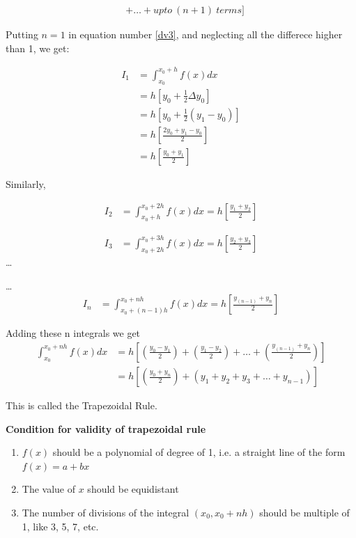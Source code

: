 \documentclass[11pt, a4paper, oneside]{book}
\begin{document}
          \begin{align}\label{dv3}
              &+ \dots+upto\ (n+1)\ terms]
          \end{align}

          Putting $n=1$ in equation number \ref{dv3}, and neglecting all the differece
          higher than 1, we get:

          \begin{align*}
            I_1 &= \int_{x_0}^{x_0+h}f(x)dx\\
                &= h[y_0+\frac{1}{2}\Delta y_0]\\
                &= h[y_0+\frac{1}{2}(y_1-y_0)]\\
                &= h[\frac{2y_0+y_1-y_0}{2}]\\
                &= h[\frac{y_0+y_1}{2}]
          \end{align*}

          Similarly,

          \begin{align*}
            I_2 &= \int_{x_0+h}^{x_0+2h}f(x)dx = h[\frac{y_1+y_2}{2}]
          \end{align*}

          \begin{align*}
            I_3 &= \int_{x_0+2h}^{x_0+3h}f(x)dx = h[\frac{y_2+y_3}{2}]
          \end{align*}
          \dots

          \dots
          \begin{align*}
            I_n &= \int_{x_0+(n-1)h}^{x_0+nh}f(x)dx = h[\frac{y_{(n-1)}+y_n}{2}]
          \end{align*}

          Adding these n integrals we get
          \begin{align*}
            \int_{x_0}^{x_0+nh}f(x)dx &= h[(\frac{y_0-y_1}{2})+(\frac{y_1-y_2}{2})+\dots+(\frac{y_{(n-1)}+y_n}{2})]\\
                                      &= h[(\frac{y_0+y_n}{2})+(y_1+y_2+y_3+\dots+y_{n-1})]
          \end{align*}

          This is called the Trapezoidal Rule.

          \pagebreak
          \textbf{Condition for validity of trapezoidal rule}
          \begin{enumerate}
            \item $f(x)$ should be a polynomial of degree of 1, i.e. a
              straight line of the form $f(x)=a+bx$
            \item The value of $x$ should be equidistant
            \item The number of divisions of the integral $(x_0,x_0+nh)$
              should be multiple of 1, like 3, 5, 7, etc.
          \end{enumerate}
\end{document}
